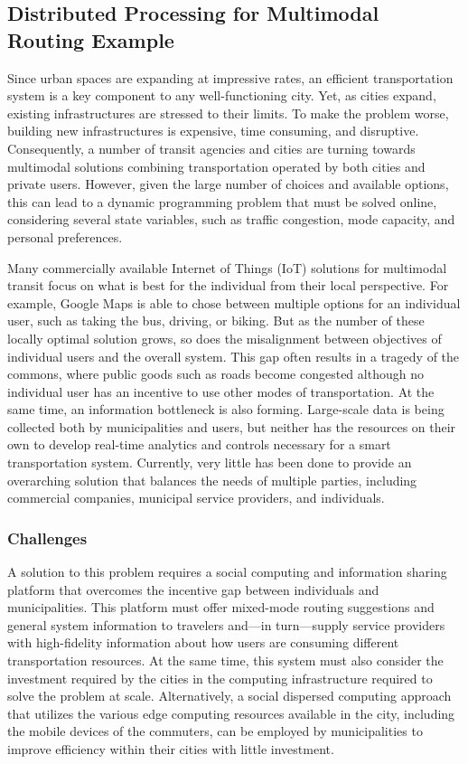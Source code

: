 \documentclass[12pt,letterpaper]{article}
\newcommand{\Aron}[1]{\todo[color=green!40, linecolor=black!50]{\textbf{Aron}: #1}}
\begin{document}
\subsection{Distributed Processing for Multimodal Routing Example}

Since urban spaces are expanding at impressive rates, an efficient transportation system is a key component to any well-functioning city. Yet, as cities expand, existing infrastructures are stressed to their limits. To make the problem worse,  building new infrastructures is expensive, time consuming, and disruptive. Consequently, a number of transit agencies and cities are turning towards multimodal  solutions combining transportation operated by both cities and private users. However, given the large number of choices and available options, this can lead to a %
dynamic programming problem that must be solved online, considering several state variables, such as traffic congestion, mode capacity, and personal preferences. 

Many commercially available Internet of Things (IoT) solutions for multimodal
transit focus on what is best for the individual from their local perspective. For example, Google Maps is able to chose between multiple options for an individual user, such as taking the bus, driving, or biking. But as the number of these locally optimal solution grows, so does the misalignment between objectives of individual users and the overall system. This gap often results in a tragedy of the commons, where public goods such as roads become congested although no individual user has an incentive to use other modes of transportation. At the same time, an information bottleneck is also forming. Large-scale data is being collected both by municipalities and users, but neither has the resources on their own to develop real-time analytics and controls necessary for a smart transportation system. Currently, very little has been done to provide an overarching solution that balances the needs of multiple parties, including commercial companies, municipal service providers, and individuals. 

\subsubsection{Challenges}
A solution to this problem requires a social computing and information sharing platform that overcomes the incentive gap between individuals and municipalities. This platform must offer mixed-mode routing suggestions and general system information to travelers and---in turn---supply service providers with high-fidelity information about how users are consuming different transportation resources. At the same time, this system must also consider the investment required by the cities in the computing infrastructure required to solve the problem at scale. Alternatively, a social dispersed computing approach that utilizes the various edge computing resources available in the city, including the mobile devices of the commuters, can be employed by municipalities to improve efficiency within their cities with little investment.
\end{document}
